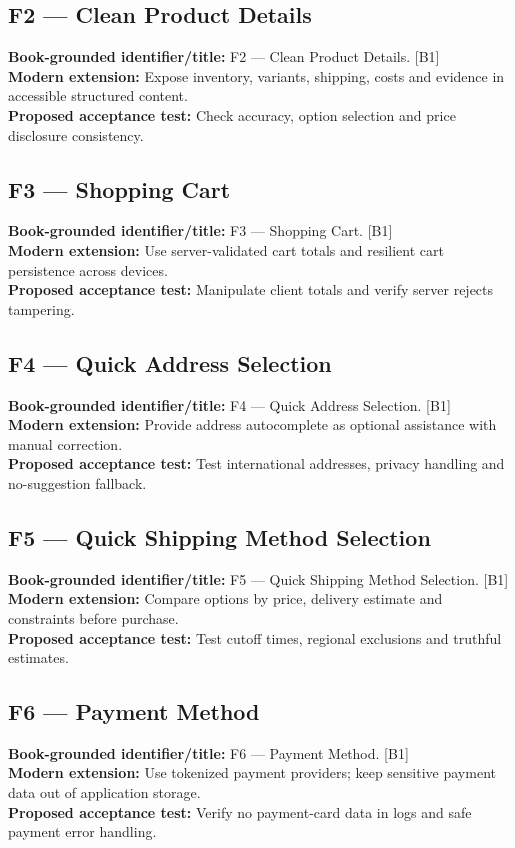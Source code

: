 \documentclass[11pt]{article}
\begin{document}
\subsection{F2 — Clean Product Details}
\noindent\textcolor{Ocean}{\textbf{Book-grounded identifier/title:}} F2 — Clean Product Details. [B1]\\
\textcolor{Mint}{\textbf{Modern extension:}} Expose inventory, variants, shipping, costs and evidence in accessible structured content.\\
\textcolor{Amber}{\textbf{Proposed acceptance test:}} Check accuracy, option selection and price disclosure consistency.\medskip
\subsection{F3 — Shopping Cart}
\noindent\textcolor{Ocean}{\textbf{Book-grounded identifier/title:}} F3 — Shopping Cart. [B1]\\
\textcolor{Mint}{\textbf{Modern extension:}} Use server-validated cart totals and resilient cart persistence across devices.\\
\textcolor{Amber}{\textbf{Proposed acceptance test:}} Manipulate client totals and verify server rejects tampering.\medskip
\subsection{F4 — Quick Address Selection}
\noindent\textcolor{Ocean}{\textbf{Book-grounded identifier/title:}} F4 — Quick Address Selection. [B1]\\
\textcolor{Mint}{\textbf{Modern extension:}} Provide address autocomplete as optional assistance with manual correction.\\
\textcolor{Amber}{\textbf{Proposed acceptance test:}} Test international addresses, privacy handling and no-suggestion fallback.\medskip
\subsection{F5 — Quick Shipping Method Selection}
\noindent\textcolor{Ocean}{\textbf{Book-grounded identifier/title:}} F5 — Quick Shipping Method Selection. [B1]\\
\textcolor{Mint}{\textbf{Modern extension:}} Compare options by price, delivery estimate and constraints before purchase.\\
\textcolor{Amber}{\textbf{Proposed acceptance test:}} Test cutoff times, regional exclusions and truthful estimates.\medskip
\subsection{F6 — Payment Method}
\noindent\textcolor{Ocean}{\textbf{Book-grounded identifier/title:}} F6 — Payment Method. [B1]\\
\textcolor{Mint}{\textbf{Modern extension:}} Use tokenized payment providers; keep sensitive payment data out of application storage.\\
\textcolor{Amber}{\textbf{Proposed acceptance test:}} Verify no payment-card data in logs and safe payment error handling.\medskip
\end{document}
